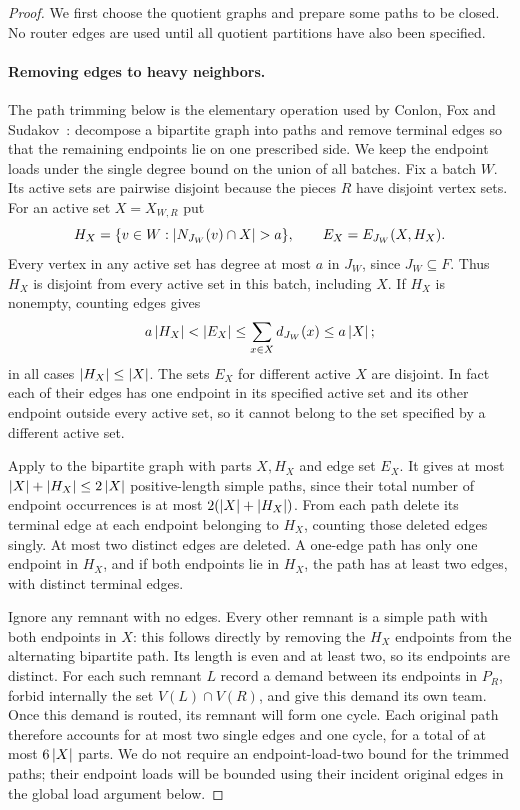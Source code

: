 \begin{proof}
We first choose the quotient graphs and prepare some paths to be closed.
No router edges are used until all quotient partitions have also been
specified.

\paragraph{Removing edges to heavy neighbors.}
The path trimming below is the elementary operation used by
Conlon, Fox and Sudakov~\cite[Lemma~6.3]{CFS2014}: decompose a
bipartite graph into paths and remove terminal edges so that the
remaining endpoints lie on one prescribed side. We keep the endpoint
loads under the single degree bound on the union of all batches.
Fix a batch $W$.  Its active sets are pairwise disjoint because the pieces
$R$ have disjoint vertex sets.  For an active set $X=X_{W,R}$ put
\[
 H_X=\{v\in W:\abs{N_{J_W}(v)\cap X}>a\},
 \qquad E_X=E_{J_W}(X,H_X).
\]
Every vertex in any active set has degree at most $a$ in $J_W$, since
$J_W\subseteq F$.  Thus $H_X$ is disjoint from every active set in this
batch, including $X$.  If $H_X$ is nonempty, counting edges gives
\[
 a\left|H_X\right|<\left|E_X\right|
 \le\sum_{x\in X}d_{J_W}(x)\le a\left|X\right|;
\]
in all cases $\left|H_X\right|\le\left|X\right|$.  The sets $E_X$ for different active
$X$ are disjoint.  In fact each of their edges has one endpoint in its
specified active set and its other endpoint outside every active set,
so it cannot belong to the set specified by a different active set.

Apply  to the bipartite graph with parts
$X,H_X$ and edge set $E_X$.  It gives at most
$\left|X\right|+\left|H_X\right|\le2\left|X\right|$ positive-length simple paths, since their
total number of endpoint occurrences is at most
$2(\left|X\right|+\left|H_X\right|)$.  From each path delete its terminal
edge at each endpoint belonging to $H_X$, counting those deleted edges
singly.  At most two distinct edges are deleted.  A one-edge path has
only one endpoint in $H_X$, and if both endpoints lie in $H_X$, the
path has at least two edges, with distinct terminal edges.

Ignore any remnant with no edges.  Every other remnant is a simple path
with both endpoints in $X$: this follows directly by removing the
$H_X$ endpoints from the alternating bipartite path.  Its length is
even and at least two, so its endpoints are distinct.  For each such
remnant $L$ record a demand between its endpoints in $P_R$, forbid
internally the set $V(L)\cap V(R)$, and give this demand its own team.
Once this demand is routed, its remnant will form one cycle.  Each
original path therefore accounts for at most two single edges and one
cycle, for a total of at most $6\left|X\right|$ parts.  We do not require an
endpoint-load-two bound for the trimmed paths; their endpoint loads will
be bounded using their incident original edges in the global load
argument below.


\end{proof}
